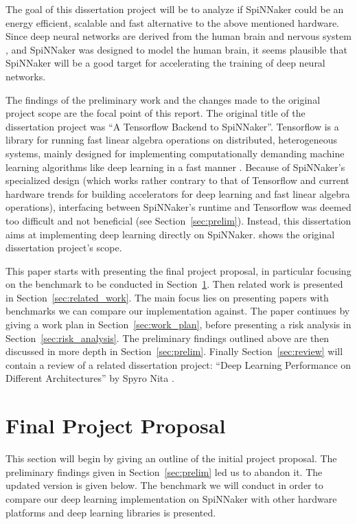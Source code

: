 \documentclass{article}
\begin{document}
The goal of this dissertation project will be to analyze if SpiNNaker
could be an energy efficient, scalable and fast alternative to the
above mentioned hardware.
Since deep neural networks are derived from the human
brain and nervous system \citep{goodfellow2016}, and SpiNNaker
was designed to model the human brain, it seems plausible that
SpiNNaker will be a good target for accelerating the training of deep
neural networks.

The findings of the preliminary work and the changes made
to the original project scope are the focal point of this
report.
The original title of the dissertation project was ``A
Tensorflow Backend to SpiNNaker''.
Tensorflow is a library for running fast linear algebra operations on
distributed, heterogeneous systems, mainly designed for implementing
computationally demanding machine learning algorithms like deep
learning in a fast manner \citep{tf2015}.
Because of SpiNNaker's specialized design (which works
rather contrary to that of Tensorflow and current hardware
trends for building accelerators for deep learning and fast linear
algebra operations), interfacing between SpiNNaker's runtime and
Tensorflow was deemed too difficult and not beneficial
(see Section~\ref{sec:prelim}).
Instead, this dissertation aims at implementing deep
learning directly on SpiNNaker.
\citet{proj} shows the original dissertation project's
scope.

This paper starts with presenting the final project
proposal, in particular focusing on the benchmark to be
conducted in Section~\ref{sec:proposal}.
Then related work is presented in Section~\ref{sec:related_work}.
The main focus lies on presenting papers with benchmarks
we can compare our implementation against.
The paper continues by giving a work plan in
Section~\ref{sec:work_plan}, before presenting a risk
analysis in Section~\ref{sec:risk_analysis}.
The preliminary findings outlined above are then
discussed in more depth in Section~\ref{sec:prelim}.
Finally Section~\ref{sec:review} will contain a review of a
related dissertation project:
``Deep Learning Performance on Different Architectures'' by
Spyro Nita \citep{nita_2018}.


\section{Final Project Proposal} %
\label{sec:proposal}

This section will begin by giving an outline of the initial
project proposal.
The preliminary findings given in Section~\ref{sec:prelim}
led us to abandon it.
The updated version is given below.
The benchmark we will conduct in order to compare our deep learning
implementation on SpiNNaker with other hardware platforms
and deep learning libraries is presented.
\end{document}
